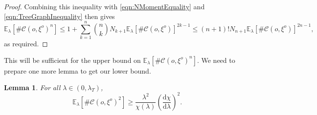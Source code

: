 \documentclass[10pt,a4paper,dvipsnames]{article}
\newtheorem{lemma}[theorem]{Lemma}
\theoremstyle{definition}
\theoremstyle{remark}
\newcommand{\ela}{\mathbb E_{\lambda}}
\newcommand{\dd}{\mathrm{d}} %
\newcommand{\C}{\mathscr {C}}
\newcommand{\orig}{o}
\numberwithin{equation}{section}
\begin{document}
\begin{proof}
Combining this inequality with \eqref{eqn:NMomentEquality} and \eqref{eqn:TreeGraphInequality} then gives
\begin{equation}
    \ela\left[\#\C\left(\orig,\xi^{\orig}\right)^n\right] \leq 1 + \sum^n_{k=1}\binom{n}{k}N_{k+1}\ela\left[\#\C\left(\orig,\xi^{\orig}\right)\right]^{2k-1} \leq \left(n+1\right)!N_{n+1}\ela\left[\#\C\left(\orig,\xi^{\orig}\right)\right]^{2n-1},
\end{equation}
as required.
\end{proof}

This will be sufficient for the upper bound on $\ela\left[\#\C\left(\orig,\xi^{\orig}\right)^n\right]$. We need to prepare one more lemma to get our lower bound.

\begin{lemma}
\label{lem:SecondMomentLowerBound}
    For all $\lambda\in\left(0,\lambda_T\right)$,
    \begin{equation}
        \ela\left[\#\C\left(\orig,\xi^{\orig}\right)^2\right] \geq \frac{\lambda^2}{\chi\left(\lambda\right)}\left(\frac{\dd \chi}{\dd \lambda}\right)^2.
    \end{equation}
\end{lemma}
\end{document}
